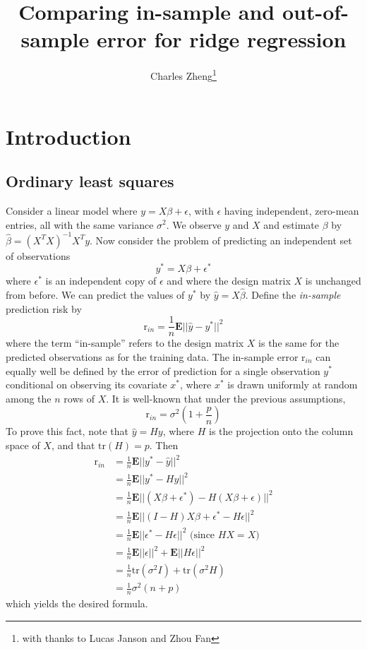 \documentclass[11pt]{article}
\begin{document}
\newcommand{\tr}{\text{tr}}
\newcommand{\E}{\textbf{E}}
\newcommand{\diag}{\text{diag}}
\newcommand{\argmax}{\text{argmax}}
\newcommand{\argmin}{\text{argmin}}
\newcommand{\Cov}{\text{Cov}}
\newcommand{\Vol}{\text{Vol}}

\title{Comparing in-sample and out-of-sample error for ridge regression}

\author{Charles Zheng\thanks{with thanks to Lucas Janson and Zhou Fan}}

\maketitle

\section{Introduction}

\subsection{Ordinary least squares}

Consider a linear model where $y = X\beta + \epsilon$, with $\epsilon$
having independent, zero-mean entries, all with the same variance
$\sigma^2$.  We observe $y$ and $X$ and estimate $\beta$ by
$\hat{\beta} = (X^T X)^{-1} X^T y$.  Now consider the problem of
predicting an independent set of observations
\[
y^* = X\beta + \epsilon^*
\]
where $\epsilon^*$ is an independent copy of $\epsilon$ and where the
design matrix $X$ is unchanged from before.  We can predict the values
of $y^*$ by $\hat{y} = X\hat{\beta}$.  Define the \emph{in-sample}
prediction risk by
\[
\text{r}_{in} = \frac{1}{n} \E ||\hat{y} - y^*||^2
\]
where the term ``in-sample'' refers to the design matrix $X$ is the
same for the predicted observations as for the training data.  The
in-sample error $\text{r}_{in}$ can equally well be defined by the
error of prediction for a single observation $y^*$ conditional on
observing its covariate $x^*$, where $x^*$ is drawn uniformly at
random among the $n$ rows of $X$.  It is well-known that under the
previous assumptions,
\[
\text{r}_{in} = \sigma^2 \left(1 + \frac{p}{n}\right)
\]
To prove this fact, note that $\hat{y} = Hy$, where $H$ is the
projection onto the column space of $X$, and that $\tr(H) = p$.  Then
\begin{align*}
\text{r}_{in} &= \frac{1}{n} \E ||y^* - \hat{y}||^2
\\&= \frac{1}{n} \E ||y^* - Hy||^2
\\&= \frac{1}{n} \E ||(X\beta + \epsilon^*) - H(X\beta + \epsilon)||^2
\\&= \frac{1}{n} \E ||(I-H)X\beta + \epsilon^* - H\epsilon||^2
\\&= \frac{1}{n} \E ||\epsilon^* - H\epsilon||^2 \text{ (since $HX = X$) }
\\&= \frac{1}{n} \E ||\epsilon||^2 + \E ||H\epsilon||^2
\\&= \frac{1}{n} \tr(\sigma^2 I) + \tr(\sigma^2 H)
\\&= \frac{1}{n} \sigma^2(n + p)
\end{align*}
which yields the desired formula.
\end{document}
